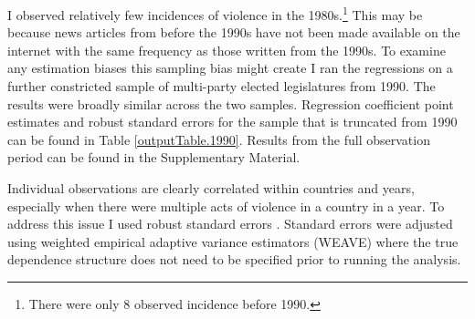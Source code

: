 \documentclass[a4paper]{article}\usepackage[]{graphicx}\usepackage[]{color}
\begin{document}
I observed relatively few incidences of violence in the 1980s.\footnote{There were only 8 observed incidence before 1990.} This may be because news articles from before the 1990s have not been made available on the internet with the same frequency as those written from the 1990s. To examine any estimation biases this sampling bias might create I ran the regressions on a further constricted sample of multi-party elected legislatures from 1990. The results were broadly similar across the two samples. Regression coefficient point estimates and robust standard errors for the sample that is truncated from 1990 can be found in Table \ref{outputTable.1990}. Results from the full observation period can be found in the Supplementary Material.

Individual observations are clearly correlated within countries and years, especially when there were multiple acts of violence in a country in a year. To address this issue I used robust standard errors \citep{Golder2006, Mainwaring2007}. Standard errors were adjusted using \cite{Lumley1999} weighted empirical adaptive variance estimators (WEAVE) where the true dependence structure does not need to be specified prior to running the analysis.
\end{document}
